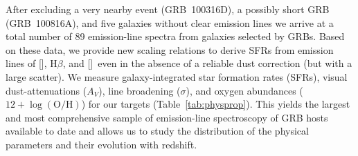 \documentclass[traditabstract, longauth]{aa}
\newcommand{\hb}{H$\beta$}
\newcommand{\oh}{12+\log(\mathrm{O/H})}
\newcommand{\oii}{[\ion{O}{ii}]}
\newcommand{\oiii}{[\ion{O}{iii}]}
\begin{document}
After excluding a very nearby event (GRB~100316D), a possibly short GRB (GRB~100816A), and five galaxies without clear emission lines we arrive at a total number of 89 emission-line spectra from galaxies selected by GRBs. Based on these data, we provide new scaling relations to derive SFRs from emission lines of \oii, \hb, and \oiii\, even in the absence of a reliable dust correction (but with a large scatter). We measure galaxy-integrated star formation rates (SFRs), visual dust-attenuations ($A_V$), line broadening ($\sigma$), and oxygen abundances ($\oh$) for our targets (Table~\ref{tab:physprop}). This yields the largest and most comprehensive sample of emission-line spectroscopy of GRB hosts available to date and allows us to study the distribution of the physical parameters and their evolution with redshift. 
\end{document}
